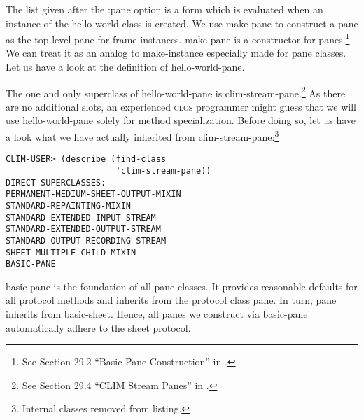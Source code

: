 \documentclass[twocolumn,a4paper]{article}
\newcommand {\concept} [1] {{\sl #1}\index{#1}}
\newcommand {\code}[1]{{\sffamily #1}}
\newcommand {\CLOS}{\textsc{clos}}
\let\class\code
\let\method\code
\let\keyword\code
\begin{document}
The list given after the \keyword{:pane} option is a form which is
evaluated when an instance of the \class{hello-world} class is
created. We use \method{make-pane} to construct a pane as the
top-level-pane for frame instances. \method{make-pane} is a
constructor for panes.\footnote{See Section 29.2 ``Basic Pane
  Construction'' in \cite{clim-spec}.} We can treat it as an analog to
\code{make-instance} especially made for pane classes.  Let us have a
look at the definition of \class{hello-world-pane}.

\lstset{style=inlinestyle} 

The one and only superclass of \class{hello-world-pane} is
\class{clim-stream-pane}.\footnote{See Section 29.4 ``CLIM Stream
  Panes'' in \cite{clim-spec}.} As there are no additional slots, an
experienced \CLOS{} programmer might guess that we will use
\class{hello-world-pane} solely for method specialization.  Before doing so,
let us have a look what we have actually
inherited from \class{clim-stream-pane}:\footnote{Internal classes
  removed from listing.}

\lstset{style=inlinestyle}
\begin{lstlisting}
CLIM-USER> (describe (find-class 
                      'clim-stream-pane))
DIRECT-SUPERCLASSES: 
PERMANENT-MEDIUM-SHEET-OUTPUT-MIXIN
STANDARD-REPAINTING-MIXIN
STANDARD-EXTENDED-INPUT-STREAM
STANDARD-EXTENDED-OUTPUT-STREAM
STANDARD-OUTPUT-RECORDING-STREAM
SHEET-MULTIPLE-CHILD-MIXIN
BASIC-PANE
\end{lstlisting}


\class{basic-pane} is the foundation of all pane classes. It provides
reasonable defaults for all protocol methods and inherits from the
protocol class \class{pane}. In turn, \class{pane} inherits from
\class{basic-sheet}. Hence, all panes we construct via
\class{basic-pane} automatically adhere to the sheet protocol.


\end{document}
